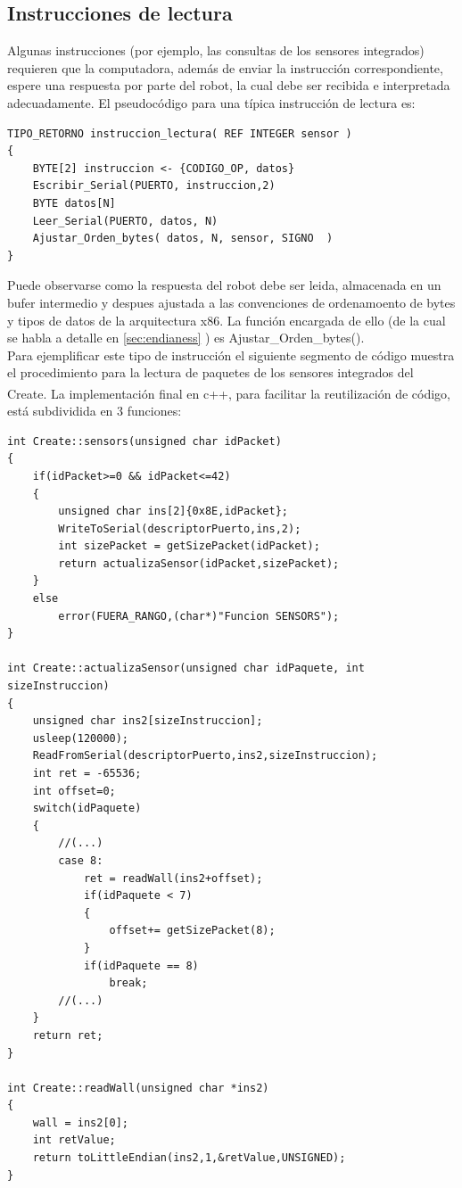 \documentclass[letterpaper,openright,12pt]{book}
\begin{document}
\subsection{Instrucciones de lectura}
Algunas instrucciones (por ejemplo, las consultas de los sensores integrados) requieren que la computadora, además de enviar la instrucción correspondiente, espere una respuesta por parte del robot, la cual debe ser recibida e interpretada adecuadamente. El pseudocódigo para una típica instrucción de lectura es:\\
\begin{lstlisting}
TIPO_RETORNO instruccion_lectura( REF INTEGER sensor )
{
	BYTE[2] instruccion <- {CODIGO_OP, datos}
	Escribir_Serial(PUERTO, instruccion,2)
	BYTE datos[N]
	Leer_Serial(PUERTO, datos, N)
	Ajustar_Orden_bytes( datos, N, sensor, SIGNO  )
}

\end{lstlisting}
Puede observarse como la respuesta del robot debe ser leida, almacenada en un bufer intermedio y despues ajustada a las convenciones de ordenamoento de bytes y tipos de datos de la arquitectura x86.	La función encargada de ello (de la cual se habla a detalle en \ref{sec:endianess} ) es Ajustar\_Orden\_bytes().\\
Para ejemplificar este tipo de instrucción el siguiente segmento de código muestra el procedimiento para la lectura de paquetes de los sensores integrados del Create\textsuperscript{\textregistered}. La implementación final en c++, para facilitar la reutilización de código, está subdividida en 3 funciones:\\
\begin{lstlisting}
int Create::sensors(unsigned char idPacket)
{
	if(idPacket>=0 && idPacket<=42)
	{
		unsigned char ins[2]{0x8E,idPacket};
		WriteToSerial(descriptorPuerto,ins,2);
		int sizePacket = getSizePacket(idPacket);
		return actualizaSensor(idPacket,sizePacket);
	}
	else
		error(FUERA_RANGO,(char*)"Funcion SENSORS");
}

int Create::actualizaSensor(unsigned char idPaquete, int sizeInstruccion)
{	
	unsigned char ins2[sizeInstruccion];
	usleep(120000);
	ReadFromSerial(descriptorPuerto,ins2,sizeInstruccion);
	int ret = -65536;
	int offset=0;
	switch(idPaquete)
	{
		//(...)
		case 8:
			ret = readWall(ins2+offset);
			if(idPaquete < 7)
			{
				offset+= getSizePacket(8);
			}
			if(idPaquete == 8)
				break;
		//(...)
	}
	return ret;
}

int Create::readWall(unsigned char *ins2)
{
	wall = ins2[0];
	int retValue;
	return toLittleEndian(ins2,1,&retValue,UNSIGNED);
}

\end{lstlisting}
\end{document}

